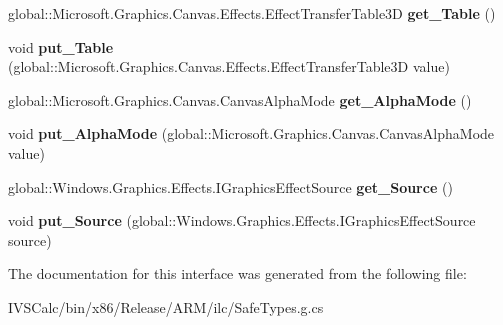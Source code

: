 \begin{DoxyCompactItemize}
global\+::\+Microsoft.\+Graphics.\+Canvas.\+Effects.\+Effect\+Transfer\+Table3D {\bfseries get\+\_\+\+Table} ()
\item 
\mbox{\label{interface_microsoft_1_1_graphics_1_1_canvas_1_1_effects_1_1_i_table_transfer3_d_effect_ab603763a514a44367ea6108e1369168a}} 
void {\bfseries put\+\_\+\+Table} (global\+::\+Microsoft.\+Graphics.\+Canvas.\+Effects.\+Effect\+Transfer\+Table3D value)
\item 
\mbox{\label{interface_microsoft_1_1_graphics_1_1_canvas_1_1_effects_1_1_i_table_transfer3_d_effect_a21d268378aa27ae6ca1034dd0f7299ca}} 
global\+::\+Microsoft.\+Graphics.\+Canvas.\+Canvas\+Alpha\+Mode {\bfseries get\+\_\+\+Alpha\+Mode} ()
\item 
\mbox{\label{interface_microsoft_1_1_graphics_1_1_canvas_1_1_effects_1_1_i_table_transfer3_d_effect_a2acd84164258602c46fd7ad7701b2a6b}} 
void {\bfseries put\+\_\+\+Alpha\+Mode} (global\+::\+Microsoft.\+Graphics.\+Canvas.\+Canvas\+Alpha\+Mode value)
\item 
\mbox{\label{interface_microsoft_1_1_graphics_1_1_canvas_1_1_effects_1_1_i_table_transfer3_d_effect_a99a72dee613feb6e1085470ab22cb3a9}} 
global\+::\+Windows.\+Graphics.\+Effects.\+I\+Graphics\+Effect\+Source {\bfseries get\+\_\+\+Source} ()
\item 
\mbox{\label{interface_microsoft_1_1_graphics_1_1_canvas_1_1_effects_1_1_i_table_transfer3_d_effect_a500a3b0cdf37153a399fb4230f6a6a3a}} 
void {\bfseries put\+\_\+\+Source} (global\+::\+Windows.\+Graphics.\+Effects.\+I\+Graphics\+Effect\+Source source)
\end{DoxyCompactItemize}


The documentation for this interface was generated from the following file\+:\begin{DoxyCompactItemize}
\item 
I\+V\+S\+Calc/bin/x86/\+Release/\+A\+R\+M/ilc/Safe\+Types.\+g.\+cs\end{DoxyCompactItemize}
